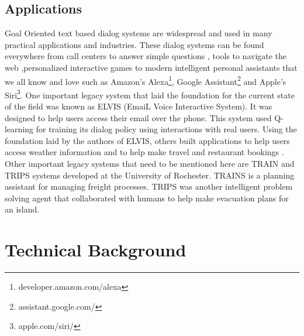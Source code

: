 \documentclass[14pt]{extarticle}
\numberwithin{equation}{section}
\begin{document}
	\subsection{Applications}
	Goal Oriented text based dialog systems are widespread and used in many practical applications and industries. These dialog systems can be found everywhere from call centers to answer simple questions \cite{georgila1998integrated}, tools to navigate the web \cite{chai2001natural} ,personalized interactive games\cite{su2013dialoguegame} to modern intelligent personal assistants that we all know and love such as Amazon's Alexa\footnote{developer.amazon.com/alexa}, Google Assistant\footnote{assistant.google.com/} and Apple's Siri\footnote{apple.com/siri/}. One important legacy system that laid the foundation for the current state of the field was known as ELVIS (EmaiL Voice Interactive System). It was designed to help users access their email over the phone\cite{ELVIS}. This system used Q-learning for training its dialog policy using interactions with real users. Using the foundation laid by the authors of ELVIS, others built applications to help users access weather information \cite{zue_jupiter} and to help make travel and restaurant bookings \cite{Shriver_unified}. Other important legacy systems that need to be mentioned here are TRAIN\cite{TRAIN} and TRIPS\cite{ferguson1998trips} systems developed at the University of Rochester. TRAINS is a planning assistant for managing freight processes. TRIPS was another intelligent problem solving agent that collaborated with humans to help make evacuation plans for an island.
	
	\pagebreak
	\section{Technical Background}
\end{document}

